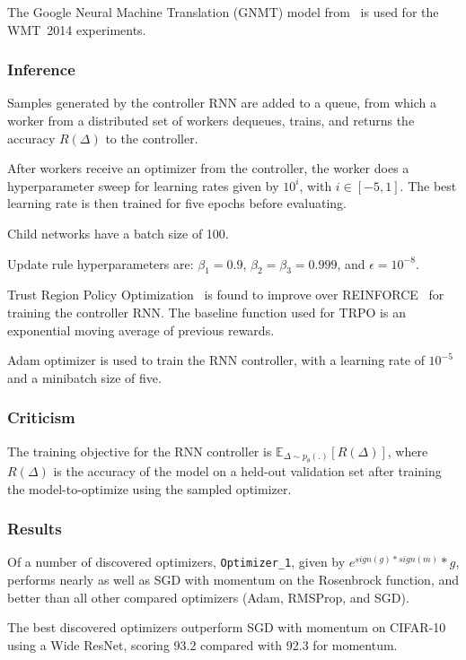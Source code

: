 \documentclass[a4paper, 12pt]{article}
\begin{document}
The Google Neural Machine Translation (GNMT) model from~\cite{gnmt-45610} is
used for the WMT~2014 experiments.

\subsubsection{Inference}

Samples generated by the controller RNN are added to a queue, from which a
worker from a distributed set of workers dequeues, trains, and returns the
accuracy $R(\Delta)$ to the controller.

After workers receive an optimizer from the controller, the worker does a
hyperparameter sweep for learning rates given by $10^i$, with $i \in [-5, 1]$.
The best learning rate is then trained for five epochs before evaluating.

Child networks have a batch size of 100.

Update rule hyperparameters are: $\beta_1 = 0.9$, $\beta_2 = \beta_3 = 0.999$,
and $\epsilon = 10^{-8}$.

Trust Region Policy Optimization~\cite{DBLP:journals/corr/SchulmanLMJA15} is
found to improve over REINFORCE~\cite{Williams1992} for training the controller
RNN\@. The baseline function used for TRPO is an exponential moving average of
previous rewards.

Adam optimizer is used to train the RNN controller, with a learning rate of
$10^{-5}$ and a minibatch size of five.

\subsubsection{Criticism}

The training objective for the RNN controller is
$\mathbb{E}_{\Delta \sim p_\theta(.)}[R(\Delta)]$, where $R(\Delta)$ is the
accuracy of the model on a held-out validation set after training the
model-to-optimize using the sampled optimizer.

\subsubsection{Results}

Of a number of discovered optimizers, \verb|Optimizer_1|, given by $e^{sign(g)
* sign(m)} * g$, performs nearly as well as SGD with momentum on the Rosenbrock
function, and better than all other compared optimizers (Adam, RMSProp, and
SGD).

The best discovered optimizers outperform SGD with momentum on CIFAR-10 using a
Wide ResNet, scoring 93.2 compared with 92.3 for momentum.
\end{document}
